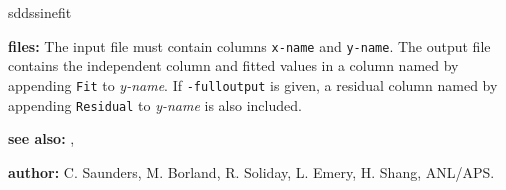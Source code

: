 \begin{sddsprog}{sddssinefit}
\begin{itemize}
    \end{itemize}
  \item \textbf{files:} The input file must contain columns \verb|x-name| and \verb|y-name|. The output file contains the
    independent column and fitted values in a column named by appending \verb|Fit| to \emph{y-name}. If \verb|-fulloutput| is
    given, a residual column named by appending \verb|Residual| to \emph{y-name} is also included.
  \item \textbf{see also:} , 
  \item \textbf{author:} C. Saunders, M. Borland, R. Soliday, L. Emery, H. Shang, ANL/APS.
\end{sddsprog}

